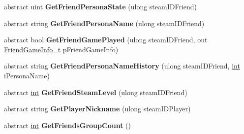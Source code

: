 \begin{DoxyCompactItemize}
\item 
\hypertarget{classValve_1_1Steamworks_1_1ISteamFriends_a0d21cb4e1225c82f4bb732250738759d}{}abstract uint {\bfseries Get\+Friend\+Persona\+State} (ulong steam\+I\+D\+Friend)\label{classValve_1_1Steamworks_1_1ISteamFriends_a0d21cb4e1225c82f4bb732250738759d}

\item 
\hypertarget{classValve_1_1Steamworks_1_1ISteamFriends_ad194d0e173aaccf86d4a3059ddbf3b9d}{}abstract string {\bfseries Get\+Friend\+Persona\+Name} (ulong steam\+I\+D\+Friend)\label{classValve_1_1Steamworks_1_1ISteamFriends_ad194d0e173aaccf86d4a3059ddbf3b9d}

\item 
\hypertarget{classValve_1_1Steamworks_1_1ISteamFriends_a6ab2e39e552ead3f95a09502389c8b9d}{}abstract bool {\bfseries Get\+Friend\+Game\+Played} (ulong steam\+I\+D\+Friend, out \hyperlink{structValve_1_1Steamworks_1_1FriendGameInfo__t}{Friend\+Game\+Info\+\_\+t} p\+Friend\+Game\+Info)\label{classValve_1_1Steamworks_1_1ISteamFriends_a6ab2e39e552ead3f95a09502389c8b9d}

\item 
\hypertarget{classValve_1_1Steamworks_1_1ISteamFriends_a064ae3683db4dad6aa940b5dda9efdfe}{}abstract string {\bfseries Get\+Friend\+Persona\+Name\+History} (ulong steam\+I\+D\+Friend, \hyperlink{SDL__thread_8h_a6a64f9be4433e4de6e2f2f548cf3c08e}{int} i\+Persona\+Name)\label{classValve_1_1Steamworks_1_1ISteamFriends_a064ae3683db4dad6aa940b5dda9efdfe}

\item 
\hypertarget{classValve_1_1Steamworks_1_1ISteamFriends_a048e7d076ba7cd4c5f2917f470c2da49}{}abstract \hyperlink{SDL__thread_8h_a6a64f9be4433e4de6e2f2f548cf3c08e}{int} {\bfseries Get\+Friend\+Steam\+Level} (ulong steam\+I\+D\+Friend)\label{classValve_1_1Steamworks_1_1ISteamFriends_a048e7d076ba7cd4c5f2917f470c2da49}

\item 
\hypertarget{classValve_1_1Steamworks_1_1ISteamFriends_a19e56a788782c878b22f23d646176b1c}{}abstract string {\bfseries Get\+Player\+Nickname} (ulong steam\+I\+D\+Player)\label{classValve_1_1Steamworks_1_1ISteamFriends_a19e56a788782c878b22f23d646176b1c}

\item 
\hypertarget{classValve_1_1Steamworks_1_1ISteamFriends_a06524d45fe492be044c6a88c2d80f166}{}abstract \hyperlink{SDL__thread_8h_a6a64f9be4433e4de6e2f2f548cf3c08e}{int} {\bfseries Get\+Friends\+Group\+Count} ()\label{classValve_1_1Steamworks_1_1ISteamFriends_a06524d45fe492be044c6a88c2d80f166}


\end{DoxyCompactItemize}
